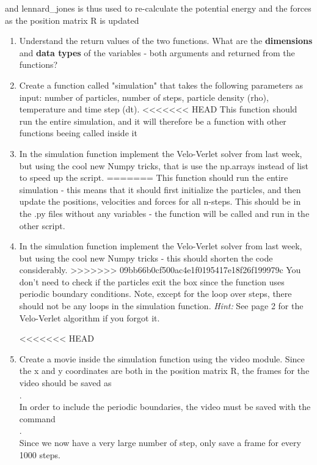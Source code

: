 \documentclass{article}
\begin{document}
and lennard\_jones is thus used to re-calculate the potential energy and the
forces as the position matrix R is updated
\begin{enumerate}[resume]
    \item Understand the return values of the two functions.
        What are the \textbf{dimensions} and \textbf{data types} of the variables - both arguments and returned from the functions?

    \item Create a function called "simulation" that takes the following parameters as input:
        number of particles,
        number of steps,
        particle density (rho),
        temperature and
        time step (dt).
<<<<<<< HEAD
        This function should run the entire simulation, and it will therefore
        be a function with other functions beeing called inside it

    \item In the simulation function implement the Velo-Verlet solver from last
        week, but using the cool new Numpy tricks, that is use the np.arrays
        instead of list to speed up the script.
=======
  This function should run the entire simulation - this means that it should first initialize the particles, and then update the positions, velocities and forces for all n-steps. This should be in the .py files without any variables - the function will be called and run in the other script.


    \item In the simulation function implement the Velo-Verlet solver from last week, but using the cool new Numpy tricks - this should shorten the code considerably.
>>>>>>> 09bb66b0cf500ac4e1f0195417e18f26f199979c
        You don't need to check if the particles exit the box since the  function uses periodic boundary conditions.
        Note, except for the loop over steps, there should not be any loops in the simulation function.
       {\em Hint:} See page 2 for the Velo-Verlet algorithm if you forgot it.


<<<<<<< HEAD

    \item Create a movie inside the simulation function using the video module. Since the x and y coordinates
        are both in the position matrix R, the frames for the video should be
        saved as\\
        .\\
        In order to include the
        periodic boundaries, the video must be saved with the command\\
        .\\
        Since we now have a very large number of step, only save a frame for every 1000 steps.


\end{enumerate}
\end{document}

